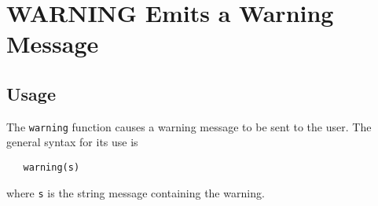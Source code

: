\section{WARNING Emits a Warning Message}

\subsection{Usage}

The \verb|warning| function causes a warning message to be
sent to the user.  The general syntax for its use is
\begin{verbatim}
   warning(s)
\end{verbatim}
where \verb|s| is the string message containing the warning.
